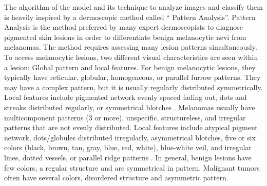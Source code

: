 \documentclass[10pt,twocolumn]{article}
\begin{document}
The algorithm of the model and its technique to analyze images and classify them is heavily inspired by a dermoscopic method called “ Pattern Analysis”.
\newline
Pattern Analysis is the method preferred by many expert dermoscopists to diagnose pigmented skin lesions in order to differentiate benign melanocytic nevi from melanomas. The method requires assessing many lesion patterns simultaneously. To access melanocytic lesions, two different visual characteristics are seen within a lesion: Global pattern and local features. For benign melanocytic lesions, they typically have reticular, globular, homogeneous, or parallel furrow patterns. They may have a complex pattern, but it is usually regularly distributed symmetrically. Local features include pigmented network evenly spaced fading out, dots and streaks distributed regularly, or symmetrical blotches \cite{DermNet}.
\newline
Melanomas usually have multicomponent patterns (3 or more), unspecific, structureless, and irregular patterns that are not evenly distributed. Local features include atypical pigment network, dots/globules distributed irregularly, asymmetrical blotches, five or six colors (black, brown, tan, gray, blue, red, white), blue-white veil, and irregular lines, dotted vessels, or parallel ridge patterns \cite{DermNet}. 
\newline
In general, benign lesions have few colors, a regular structure and are symmetrical in pattern. Malignant tumors often have several colors, disordered structure and asymmetric pattern.
\end{document}
